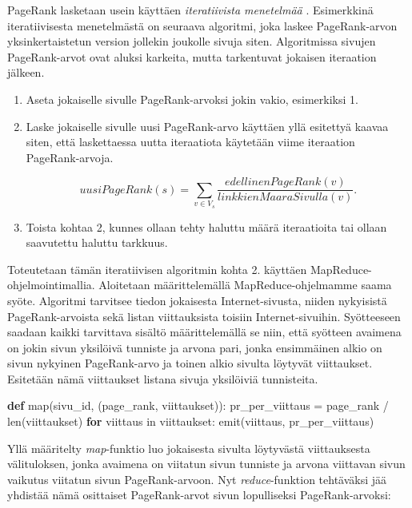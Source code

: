 \documentclass[finnish]{templates/tktltiki2}
\newenvironment{Shaded}{}{}
\newcommand{\KeywordTok}[1]{\textcolor[rgb]{0.00,0.44,0.13}{\textbf{{#1}}}}
\newcommand{\DataTypeTok}[1]{\textcolor[rgb]{0.56,0.13,0.00}{{#1}}}
\newcommand{\NormalTok}[1]{{#1}}
\theoremstyle{definition}
\theoremstyle{remark}
\begin{document}
PageRank lasketaan usein käyttäen \emph{iteratiivista menetelmää}
\cite{pagerank-mapreduce}. Esimerkkinä iteratiivisesta menetelmästä
on seuraava algoritmi, joka laskee PageRank-arvon yksinkertaistetun
version jollekin joukolle sivuja siten. Algoritmissa sivujen
PageRank-arvot ovat aluksi karkeita, mutta tarkentuvat jokaisen
iteraation jälkeen.

\begin{enumerate}
\def\labelenumi{\arabic{enumi}.}
\item
  Aseta jokaiselle sivulle PageRank-arvoksi jokin vakio, esimerkiksi 1.
\item
  Laske jokaiselle sivulle uusi PageRank-arvo käyttäen yllä esitettyä
  kaavaa siten, että laskettaessa uutta iteraatiota käytetään viime
  iteraation PageRank-arvoja.

  \[
  uusiPageRank(s) = \sum_{v \in V_s} \frac {edellinenPageRank(v)} {linkkienMaaraSivulla(v)}.
  \]
\item
  Toista kohtaa 2, kunnes ollaan tehty haluttu määrä iteraatioita tai
  ollaan saavutettu haluttu tarkkuus.
\end{enumerate}

Toteutetaan tämän iteratiivisen algoritmin kohta 2. käyttäen
MapReduce-ohjelmointimallia. Aloitetaan määrittelemällä
MapReduce-ohjelmamme saama syöte. Algoritmi tarvitsee tiedon jokaisesta
Internet-sivusta, niiden nykyisistä PageRank-arvoista sekä listan
viittauksista toisiin Internet-sivuihin. Syötteeseen saadaan kaikki
tarvittava sisältö määrittelemällä se niin, että syötteen avaimena on
jokin sivun yksilöivä tunniste ja arvona pari, jonka ensimmäinen alkio
on sivun nykyinen PageRank-arvo ja toinen alkio sivulta löytyvät
viittaukset. Esitetään nämä viittaukset listana sivuja yksilöiviä
tunnisteita.

\begin{Shaded}
\begin{Highlighting}[]
\KeywordTok{def} \DataTypeTok{map}\NormalTok{(sivu_id, (page_rank, viittaukset)):}
    \NormalTok{pr_per_viittaus = page_rank / }\DataTypeTok{len}\NormalTok{(viittaukset)}
    \KeywordTok{for} \NormalTok{viittaus in viittaukset:}
        \NormalTok{emit(viittaus, pr_per_viittaus)}
\end{Highlighting}
\end{Shaded}

Yllä määritelty \emph{map}-funktio luo jokaisesta sivulta löytyvästä
viittauksesta välituloksen, jonka avaimena on viitatun sivun tunniste ja
arvona viittavan sivun vaikutus viitatun sivun PageRank-arvoon. Nyt
\emph{reduce}-funktion tehtäväksi jää yhdistää nämä osittaiset
PageRank-arvot sivun lopulliseksi PageRank-arvoksi:
\end{document}
